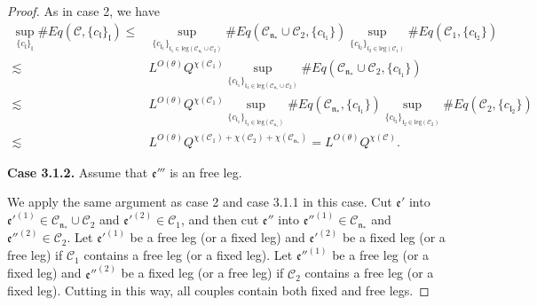 \begin{proof}
    As in case 2, we have
    \begin{equation}
    \begin{split}
     \sup_{\{c_{\mathfrak{l}}\}_{\mathfrak{l}}}\#Eq(\mathcal{C},\{c_{\mathfrak{l}}\}_{\mathfrak{l}})
     \le&
     \sup_{\{c_{\mathfrak{l}_1}\}_{\mathfrak{l}_1\in \text{leg}(\mathcal{C}_{\mathfrak{n}_*}\cup \mathcal{C}_2)} } \# Eq(\mathcal{C}_{\mathfrak{n}_*}\cup \mathcal{C}_2,\{c_{\mathfrak{l}_1}\}) \sup_{\{c_{\mathfrak{l}_2}\}_{\mathfrak{l}_2\in \text{leg}(\mathcal{C}_1)} }\# Eq(\mathcal{C}_{1}, \{c_{\mathfrak{l}_2}\})
     \\
     \lesssim& L^{O(\theta)} Q^{\chi(\mathcal{C}_1)}\sup_{\{c_{\mathfrak{l}_1}\}_{\mathfrak{l}_1\in \text{leg}(\mathcal{C}_{\mathfrak{n}_*}\cup \mathcal{C}_2)} } \# Eq(\mathcal{C}_{\mathfrak{n}_*}\cup \mathcal{C}_2,\{c_{\mathfrak{l}_1}\})
     \\
     \lesssim& L^{O(\theta)} Q^{\chi(\mathcal{C}_1)} \sup_{\{c_{\mathfrak{l}_1}\}_{\mathfrak{l}_1\in \text{leg}(\mathcal{C}_{\mathfrak{n}_*})} } \# Eq(\mathcal{C}_{\mathfrak{n}_*},\{c_{\mathfrak{l}_1}\}) \sup_{\{c_{\mathfrak{l}_2}\}_{\mathfrak{l}_2\in \text{leg}(\mathcal{C}_2)} }\# Eq(\mathcal{C}_{2}, \{c_{\mathfrak{l}_2}\})
     \\
     \lesssim& L^{O(\theta)} Q^{\chi(\mathcal{C}_1)+\chi(\mathcal{C}_2)+\chi(\mathcal{C}_{\mathfrak{n}_*})}=L^{O(\theta)} Q^{\chi(\mathcal{C})}.
    \end{split}
    \end{equation}
    
    \textbf{Case 3.1.2.} Assume that $\mathfrak{e}'''$ is an free leg. 
    
    We apply the same argument as case 2 and case 3.1.1 in this case. Cut $\mathfrak{e}'$ into $\mathfrak{e}'^{(1)}\in \mathcal{C}_{\mathfrak{n}_*}\cup \mathcal{C}_2$ and $\mathfrak{e}'^{(2)}\in \mathcal{C}_1$, and then cut $\mathfrak{e}''$ into $\mathfrak{e}''^{(1)}\in \mathcal{C}_{\mathfrak{n}_*}$ and $\mathfrak{e}''^{(2)}\in \mathcal{C}_2$. Let $\mathfrak{e}'^{(1)}$ be a free leg (or a fixed leg) and $\mathfrak{e}'^{(2)}$ be a fixed leg (or a free leg) if $\mathcal{C}_1$ contains a free leg (or a fixed leg). Let $\mathfrak{e}''^{(1)}$ be a free leg (or a fixed leg) and $\mathfrak{e}''^{(2)}$ be a fixed leg (or a free leg) if $\mathcal{C}_2$ contains a free leg (or a fixed leg). Cutting in this way, all couples contain both fixed and free legs.
    

\end{proof}
